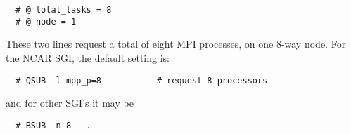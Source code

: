\begin{verbatim}
  # @ total_tasks = 8
  # @ node = 1
\end{verbatim}

These two lines request a total of eight MPI processes, on one 8-way node.
For the NCAR SGI, the default setting is:

\begin{verbatim}
  # QSUB -l mpp_p=8           # request 8 processors
\end{verbatim}

and for other SGI's it may be

\begin{verbatim}
  # BSUB -n 8   .
\end{verbatim}





